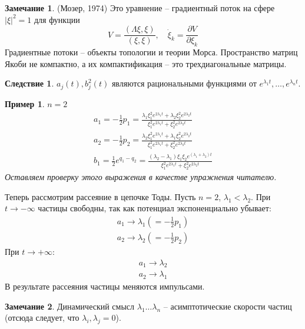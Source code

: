 \documentclass[a4paper,12pt]{article}
\newtheorem{example}{Пример}
\theoremstyle{definition}
\newtheorem{corollary}{Следствие}[theorem]
\theoremstyle{definition}
\newtheorem{mynote}{Замечание}[section]
\theoremstyle{definition}
\begin{document}
\begin{mynote}
  (Мозер, 1974)
  Это уравнение -- градиентный поток на сфере $|\xi|^{2}=1$ для функции
  \begin{equation}
    \label{eq:9}
    V=\frac{(\Lambda\xi,\xi)}{(\xi,\xi)},\quad \dot\xi_{k}=\frac{\partial V}{\partial \xi_{k}}
  \end{equation}
  Градиентные потоки -- объекты топологии и теории Морса. Пространство матриц Якоби не компактно, а их компактификация -- это трехдиагональные матрицы. 
\end{mynote}
\begin{corollary}
  $a_{j}(t), b_{j}^{2}(t)$ являются рациональными функциями от $e^{\lambda_{1}t},\dots,e^{\lambda_{n}t}$.
\end{corollary}
\begin{example}
  $n=2$
  \begin{eqnarray*}
    a_{1}=-\frac{1}{2} p_{1}=\frac{\lambda_{1} \xi_{1}^{2}e^{2\lambda_{1}t}+\lambda_{2}\xi_{2}^{2} e^{2\lambda_{2}t}}{\xi_{1}^{2} e^{2\lambda_{1}t}+\xi_{2}^{2}e^{2\lambda_{2}t}}\\
    a_{2}=-\frac{1}{2} p_{2}=\frac{\lambda_{2} \xi_{1}^{2}e^{2\lambda_{1}t}+\lambda_{1}\xi_{2}^{2} e^{2\lambda_{2}t}}{\xi_{1}^{2} e^{2\lambda_{1}t}+\xi_{2}^{2}e^{2\lambda_{2}t}}\\
    b_{1}=\frac{1}{2} e^{q_{1}-q_{2}}=\frac{(\lambda_{2}-\lambda_{1})\xi_{1}\xi_{2} e^{(\lambda_{1}+\lambda_{2})t}}{\xi_{1}^{2} e^{2\lambda_{1}t}+\xi_{2}^{2}e^{2\lambda_{2}t}}
  \end{eqnarray*}
  Оставляем проверку этого выражения в качестве упражнения читателю.
\end{example}

Теперь рассмотрим рассеяние в цепочке Тоды.
Пусть $n=2$, $\lambda_{1}<\lambda_{2}$. 
При $t\to -\infty$ частицы свободны, так как потенциал экспоненциально убывает:
\begin{eqnarray*}
  a_{1}\to\lambda_{1} (=-\frac{1}{2}p_{1})\\
  a_{2}\to\lambda_{2} (=-\frac{1}{2}p_{2})
\end{eqnarray*}
При $t\to+\infty$:
\begin{eqnarray*}
  a_{1}\to\lambda_{2}\\
  a_{2}\to\lambda_{1}
\end{eqnarray*}
В результате рассеяния частицы меняются импульсами. 

\begin{mynote}
  Динамический смысл $\lambda_{1}\dots \lambda_{n}$ -- асимптотические скорости частиц (отсюда следует, что ${\lambda_{i},\lambda_{j}}=0$).
\end{mynote}
\end{document}
